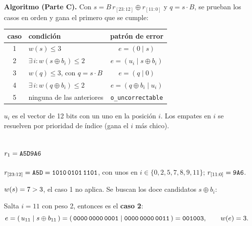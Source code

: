 \documentclass[11pt,a4paper]{article}
\begin{document}
\textbf{Algoritmo (Parte C).} Con $s = B\,r_{[23:12]} \oplus r_{[11:0]}$ y
$q = s\cdot B$, se prueban los casos en orden y gana el primero que se cumple:

\begin{center}\small
\begin{tabular}{@{}clc@{}}
\toprule
caso & condición & patrón de error \\
\midrule
1 & $w(s)\le 3$ & $e=(0\mid s)$ \\
2 & $\exists\, i: w(s\oplus b_i)\le 2$ & $e=(u_i \mid s\oplus b_i)$ \\
3 & $w(q)\le 3$, con $q=s\cdot B$ & $e=(q\mid 0)$ \\
4 & $\exists\, i: w(q\oplus b_i)\le 2$ & $e=(q\oplus b_i \mid u_i)$ \\
5 & ninguna de las anteriores & \texttt{o\_uncorrectable} \\
\bottomrule
\end{tabular}
\end{center}

$u_i$ es el vector de 12 bits con un uno en la posición $i$. Los empates
en $i$ se resuelven por prioridad de índice (gana el $i$ más chico).


\subsection{$r_1 = \texttt{A5D9A6}$}

$r_{[23:12]} = \texttt{A5D} = \texttt{1010\,0101\,1101}$, con unos en
$i\in\{0,2,5,7,8,9,11\}$; $r_{[11:0]} = \texttt{9A6}$.

\begin{center}\small
\begin{minipage}[b]{0.46\textwidth}\centering
  \rAXor
\end{minipage}\hfill
\begin{minipage}[b]{0.50\textwidth}\centering
  \rASind
\end{minipage}
\end{center}

$w(s) = 7 > 3$, el caso 1 no aplica. Se buscan los doce candidatos
$s\oplus b_i$:

\begin{center}\small
\rATablaDos
\end{center}

Salta $i=11$ con peso 2, entonces es el \textbf{caso 2}:
\[
  e = (\,u_{11} \mid s\oplus b_{11}\,)
    = (\,\texttt{0000\,0000\,0001} \mid \texttt{0000\,0000\,0011}\,)
    = \texttt{001003}, \qquad w(e)=3 .
\]
\end{document}
